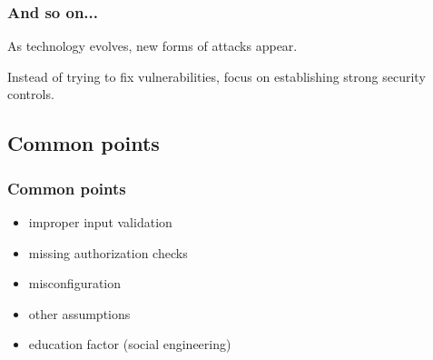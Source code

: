 \begin{frame}
\frametitle{And so on...}
As technology evolves, new forms of attacks appear.
\par
Instead of trying to fix vulnerabilities, focus on establishing strong
security controls.
\end{frame}

\subsection{Common points}

\begin{frame}
\frametitle{Common points}
\begin{itemize}
\item improper input validation
\item missing authorization checks
\item misconfiguration
\item other assumptions
\item education factor \small{(social engineering)}
\end{itemize}
\end{frame}

